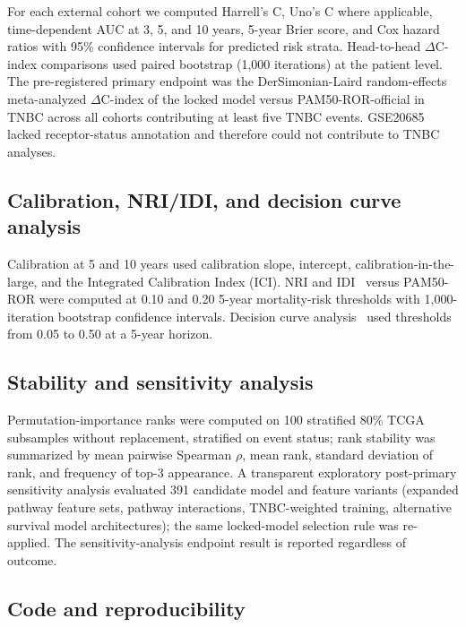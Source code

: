 \documentclass[11pt,letterpaper]{article}
\begin{document}
For each external cohort we computed Harrell's C, Uno's C where applicable, time-dependent AUC at 3, 5, and 10 years, 5-year Brier score, and Cox hazard ratios with 95\% confidence intervals for predicted risk strata. Head-to-head $\Delta$C-index comparisons used paired bootstrap (1,000 iterations) at the patient level. The pre-registered primary endpoint was the DerSimonian-Laird random-effects~\cite{dersimonian1986meta} meta-analyzed $\Delta$C-index of the locked model versus PAM50-ROR-official in TNBC across all cohorts contributing at least five TNBC events. GSE20685 lacked receptor-status annotation and therefore could not contribute to TNBC analyses.

\subsection*{Calibration, NRI/IDI, and decision curve analysis}

Calibration at 5 and 10 years used calibration slope, intercept, calibration-in-the-large, and the Integrated Calibration Index (ICI). NRI and IDI~\cite{pencina2008evaluating,vickers2010traditional} versus PAM50-ROR were computed at 0.10 and 0.20 5-year mortality-risk thresholds with 1,000-iteration bootstrap confidence intervals. Decision curve analysis~\cite{vickers2006decision} used thresholds from 0.05 to 0.50 at a 5-year horizon.

\subsection*{Stability and sensitivity analysis}

Permutation-importance ranks were computed on 100 stratified 80\% TCGA subsamples without replacement, stratified on event status; rank stability was summarized by mean pairwise Spearman $\rho$, mean rank, standard deviation of rank, and frequency of top-3 appearance. A transparent exploratory post-primary sensitivity analysis evaluated 391 candidate model and feature variants (expanded pathway feature sets, pathway interactions, TNBC-weighted training, alternative survival model architectures); the same locked-model selection rule was re-applied. The sensitivity-analysis endpoint result is reported regardless of outcome.

\subsection*{Code and reproducibility}
\end{document}
